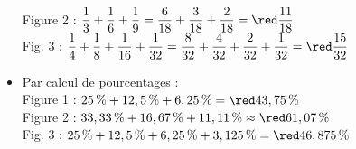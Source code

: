 \begin{corrige}
\begin{itemize}
         Figure 2 : $\dfrac13+\dfrac16+\dfrac19 =\dfrac{6}{18}+\dfrac{3}{18}+\dfrac{2}{18} =\red \dfrac{11}{18}$ \\ [1mm]
         Fig. 3 : $\dfrac14+\dfrac18+\dfrac{1}{16}+\dfrac{1}{32} =\dfrac{8}{32}+\dfrac{4}{32}+\dfrac{2}{32}+\dfrac{1}{32} =\red \dfrac{15}{32}$ \\
      \item Par calcul de pourcentages : \\ [1mm]
         Figure 1 : $25\,\%+12,5\,\%+6,25\,\% =\red 43,75\,\%$ \\ [1mm]
         Figure 2 : $33,33\,\%+16,67\,\%+11,11\,\% \approx \red 61,07\,\%$ \\ [1mm]
         Fig. 3 : $25\,\%+12,5\,\%+6,25\,\%+3,125\,\% =\red 46,875\,\%$
   \end{itemize}
\end{corrige}